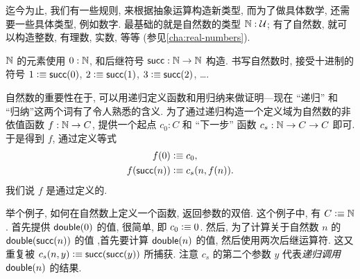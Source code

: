 %
%
%
迄今为止, 我们有一些规则, 来根据抽象运算构造新类型, 而为了做具体数学, 还需要一些具体类型, 例如数字.
最基础的就是自然数的类型 $\mathbb{N} : \mathcal{U}$;
有了自然数, 就可以构造整数, 有理数, 实数, 等等 (参见\cref{cha:real-numbers}).

$\mathbb{N}$ 的元素使用 $0 : \mathbb{N}$, 和后继符号 $\mathsf{succ} : \mathbb{N} \to \mathbb{N}$ 构造.
书写自然数时, 接受十进制的符号 $1 \vcentcolon\equiv \mathsf{succ}(0)$, $2 \vcentcolon\equiv \mathsf{succ}(1)$, $3 \vcentcolon\equiv \mathsf{succ}(2)$, \dots.

自然数的重要性在于, 可以用递归定义函数和用归纳来做证明---现在 ``递归'' 和 ``归纳''这两个词有了令人熟悉的含义.
%
为了通过递归构造一个定义域为自然数的非依值函数 $f : \mathbb{N} \to C$, 提供一个起点 $c_0 : C$ 和 ``下一步'' 函数 $c_s : \mathbb{N} \to C \to C$ 即可.
于是得到 $f$, 通过定义等式
%
\begin{align*}
    f(0) &\vcentcolon\equiv c_0, \\
    f(\mathsf{succ}(n)) &\vcentcolon\equiv c_s(n,f(n)).
\end{align*}
我们说 $f$ 是通过定义的.
%
%

举个例子, 如何在自然数上定义一个函数, 返回参数的双倍.
这个例子中, 有 $C\vcentcolon\equiv \mathbb{N}$.
首先提供 $\mathsf{double}(0)$ 的值, 很简单, 即 $c_0 \vcentcolon\equiv 0$.
然后, 为了计算关于自然数 $n$ 的 $\mathsf{double}(\mathsf{succ}(n))$ 的值 ,首先要计算 $\mathsf{double}(n)$ 的值, 然后使用两次后继运算符.
这又重复被 $c_s(n,y) \vcentcolon\equiv \mathsf{succ}(\mathsf{succ}(y))$ 所捕获.
注意 $c_s$ 的第二个参数 $y$ 代表\emph{递归调用} $\mathsf{double}(n)$ 的结果.

